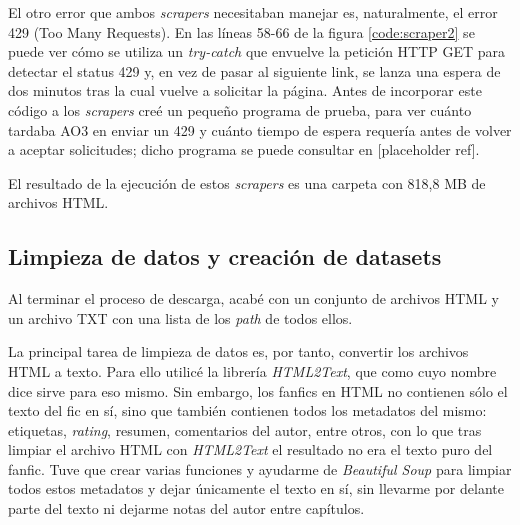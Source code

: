 \documentclass{pre-tfg}
\newcommand{\refToTrialCode}{[placeholder ref]}
\begin{document}
El otro error que ambos \textit{scrapers} necesitaban manejar es, naturalmente, el error 429 (Too Many Requests). En las líneas 58-66 de la figura \ref{code:scraper2} se puede ver cómo se utiliza un \textit{try-catch} que envuelve la petición HTTP GET para detectar el status 429 y, en vez de pasar al siguiente link, se lanza una espera de dos minutos tras la cual vuelve a solicitar la página. Antes de incorporar este código a los \textit{scrapers} creé un pequeño programa de prueba, para ver cuánto tardaba AO3 en enviar un 429 y cuánto tiempo de espera requería antes de volver a aceptar solicitudes; dicho programa se puede consultar en \refToTrialCode.
 

El resultado de la ejecución de estos \textit{scrapers} es una carpeta con 818,8 MB de archivos HTML.

\subsection{Limpieza de datos y creación de datasets}
\label{sec:limpiezadatos}

Al terminar el proceso de descarga, acabé con un conjunto de archivos HTML y un archivo TXT con una lista de los \textit{path} de todos ellos.

La principal tarea de limpieza de datos es, por tanto, convertir los archivos HTML a texto. Para ello utilicé la librería \textit{HTML2Text}, que como cuyo nombre dice sirve para eso mismo. Sin embargo, los fanfics en HTML no contienen sólo el texto del fic en sí, sino que también contienen todos los metadatos del mismo: etiquetas, \textit{rating}, resumen, comentarios del autor, entre otros, con lo que tras limpiar el archivo HTML con \textit{HTML2Text} el resultado no era el texto puro del fanfic. Tuve que crear varias funciones y ayudarme de \textit{Beautiful Soup} para limpiar todos estos metadatos y dejar únicamente el texto en sí, sin llevarme por delante parte del texto ni dejarme notas del autor entre capítulos.
\end{document}
